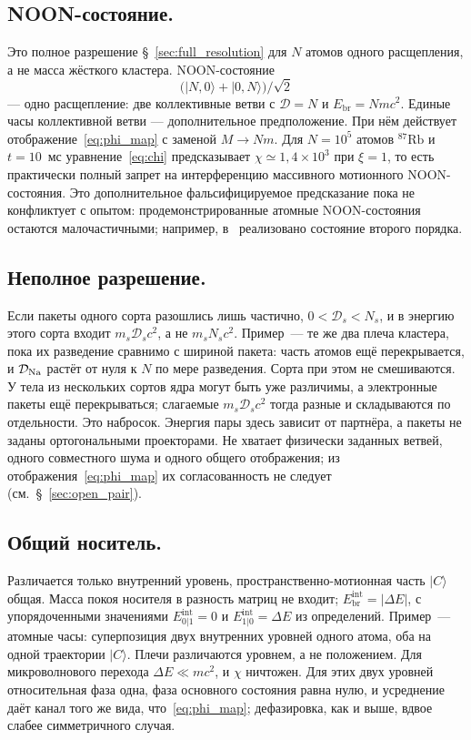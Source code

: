 \documentclass[12pt,a4paper]{article}
\begin{document}
\subsection{NOON-состояние.}
Это полное разрешение \S~\ref{sec:full_resolution} для $N$ атомов одного расщепления, а не масса жёсткого кластера. NOON-состояние
\begin{equation}
\bigl(|N,0\rangle+|0,N\rangle\bigr)/\sqrt2
\end{equation}
--- одно расщепление: две коллективные ветви с $\mathcal D=N$ и $E_{\mathrm{br}}=Nmc^2$. Единые часы коллективной ветви --- дополнительное предположение. При нём действует отображение~\eqref{eq:phi_map} с заменой $M\to Nm$. Для $N=10^5$ атомов ${}^{87}\mathrm{Rb}$ и $t=10$~мс уравнение~\eqref{eq:chi} предсказывает $\chi\simeq1{,}4\times10^3$ при $\xi=1$, то есть практически полный запрет на интерференцию массивного мотионного NOON-состояния. Это дополнительное фальсифицируемое предсказание пока не конфликтует с опытом: продемонстрированные атомные NOON-состояния остаются малочастичными; например, в~\cite{chen2010noon} реализовано состояние второго порядка.

\subsection{Неполное разрешение.}
Если пакеты одного сорта разошлись лишь частично, $0<\mathcal D_s<N_s$, и в энергию этого сорта входит $m_s\mathcal D_s c^2$, а не $m_s N_s c^2$. Пример~--- те же два плеча кластера, пока их разведение сравнимо с шириной пакета: часть атомов ещё перекрывается, и $\mathcal D_{\rm Na}$ растёт от нуля к $N$ по мере разведения. Сорта при этом не смешиваются. У тела из нескольких сортов ядра могут быть уже различимы, а электронные пакеты ещё перекрываться; слагаемые $m_s\mathcal D_s c^2$ тогда разные и складываются по отдельности. Это набросок. Энергия пары здесь зависит от партнёра, а пакеты не заданы ортогональными проекторами. Не хватает физически заданных ветвей, одного совместного шума и одного общего отображения; из отображения~\eqref{eq:phi_map} их согласованность не следует (см.~\S~\ref{sec:open_pair}).

\subsection{Общий носитель.}
Различается только внутренний уровень, пространственно-мотионная часть $|C\rangle$ общая. Масса покоя носителя в разность матриц не входит; $E_{\mathrm{br}}^{\mathrm{int}}=|\Delta E|$, с упорядоченными значениями $E_{0|1}^{\mathrm{int}}=0$ и $E_{1|0}^{\mathrm{int}}=\Delta E$ из определений. Пример~--- атомные часы: суперпозиция двух внутренних уровней одного атома, оба на одной траектории $|C\rangle$. Плечи различаются уровнем, а не положением. Для микроволнового перехода $\Delta E\ll mc^2$, и $\chi$ ничтожен. Для этих двух уровней относительная фаза одна, фаза основного состояния равна нулю, и усреднение даёт канал того же вида, что~\eqref{eq:phi_map}; дефазировка, как и выше, вдвое слабее симметричного случая.
\end{document}
